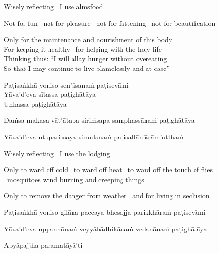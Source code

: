\begin{english-keep-with}
  Wisely reflecting \breathmark\ I use almsfood
  \begin{english-hang-together}
    Not for fun \breathmark\ not for pleasure \breathmark\ not for fattening \breathmark\ not for beautification
  \end{english-hang-together}
  Only for the maintenance and nourishment of this body\\
  For keeping it healthy \breathmark\ for helping with the holy life\\
  Thinking thus: ``I will allay hunger without overeating\\
  So that I may continue to live blamelessly and at ease''
\end{english-keep-with}

\ifafiveversion\clearpage\fi
\ifbfiveversion\clearpage\fi

Paṭisaṅkhā yoniso sen'āsanaṁ paṭisevāmi\\
Yāva'd'eva sītassa paṭighātāya\\
Uṇhassa paṭighātāya\\
\begin{pali-hang-together}
Ḍaṁsa-makasa-vāt'ātapa-siriṁsapa-samphassānaṁ paṭighātāya\\
\end{pali-hang-together}
\begin{pali-hang-together}
Yāva'd'eva utuparissaya-vinodanaṁ paṭisallān'ārām'atthaṁ
\end{pali-hang-together}

\begin{english-keep-with}
  Wisely reflecting \breathmark\ I use the lodging
  \begin{english-hang-together}
    Only to ward off cold \breathmark\ to ward off heat \breathmark\ to ward off the touch of flies \breathmark\ mosquitoes wind burning and creeping things
  \end{english-hang-together}
  \begin{english-hang-together}
    Only to remove the danger from weather \breathmark\ and for living in seclusion
  \end{english-hang-together}
\end{english-keep-with}

\begin{pali-hang}
Paṭisaṅkhā yoniso gilāna-paccaya-bhesajja-parikkhāraṁ paṭisevāmi\\
\end{pali-hang}
\ifninebythirteenversion\clearpage\fi
\begin{pali-hang-together}
Yāva'd'eva uppannānaṁ veyyābādhikānaṁ vedanānaṁ paṭighātāya\\
\end{pali-hang-together}
\begin{pali-hang-together}
Abyāpajjha-paramatāyā'ti
\end{pali-hang-together}


